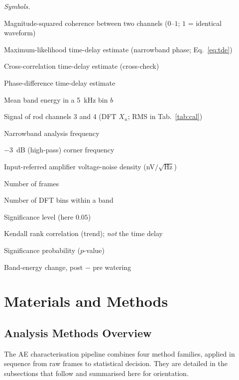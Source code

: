 \documentclass[10pt,a4paper,twocolumn]{article}
\newcommand{\gammasq}{\ensuremath{\hat{\gamma}^2}}
\newcommand{\taumle}{\ensuremath{\hat{\tau}_{\mathrm{MLE}}}}
\begin{document}
\smallskip
\noindent\textit{\small Symbols.}
{\small
\begin{description}[leftmargin=1.25cm,labelwidth=1.0cm,labelsep=0.25cm,%
  labelindent=0pt,style=sameline,font=\normalfont,itemsep=0.6pt,topsep=2pt,parsep=0pt]
\item[$\gammasq$] Magnitude-squared coherence between two channels ($0$--$1$; $1$ = identical waveform)
\item[$\taumle$] Maximum-likelihood time-delay estimate (narrowband phase; Eq.~\ref{eq:tde})
\item[$\hat\tau_\mathrm{XC}$] Cross-correlation time-delay estimate (cross-check)
\item[$\hat\tau_\mathrm{ph}$] Phase-difference time-delay estimate
\item[$E_b$] Mean band energy in a \SI{5}{\kilo\hertz} bin $b$
\item[$V_3,\,V_4$] Signal of rod channels 3 and 4 (DFT $X_n$; RMS in Tab.~\ref{tab:cal})
\item[$f_0$] Narrowband analysis frequency
\item[$f_{-3}$] \SI{-3}{\deci\bel} (high-pass) corner frequency
\item[$e_n$] Input-referred amplifier voltage-noise density (nV$/\sqrt{\text{Hz}}$)
\item[$N$] Number of frames
\item[$M$] Number of DFT bins within a band
\item[$\alpha$] Significance level (here $0.05$)
\item[$\tau$] Kendall rank correlation (trend); \emph{not} the time delay
\item[$p$] Significance probability ($p$-value)
\item[$\Delta E$] Band-energy change, post $-$ pre watering
\end{description}}

\section{Materials and Methods}

\subsection{Analysis Methods Overview}

The AE characterisation pipeline combines four method families, applied in sequence from raw frames to statistical decision. They are detailed in the subsections that follow and summarised here for orientation.
\end{document}
